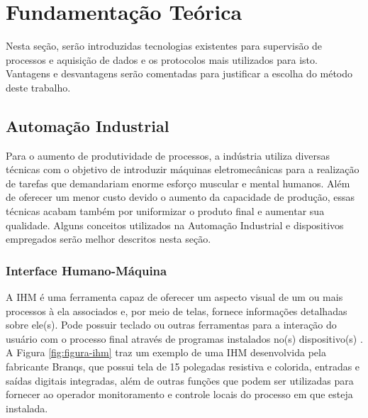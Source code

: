 \chapter{Fundamentação Teórica}
\label{cap:fundamentacao-teorica}

Nesta seção, serão introduzidas tecnologias existentes para supervisão de processos e aquisição de dados e os protocolos mais utilizados para isto. Vantagens e desvantagens serão comentadas para justificar a escolha do método deste trabalho.

    \section{Automação Industrial}        
    \label{sec:automacao-industrial}
    
    Para o aumento de produtividade de processos, a indústria utiliza diversas técnicas com o objetivo de introduzir máquinas eletromecânicas para a realização de tarefas que demandariam enorme esforço muscular e mental humanos. Além de oferecer um menor custo devido o aumento da capacidade de produção, essas técnicas acabam também por uniformizar o produto final e aumentar sua qualidade. Alguns conceitos utilizados na Automação Industrial e dispositivos empregados serão melhor descritos nesta seção.
    
    \subsection{Interface Humano-Máquina}
    \label{sec:ihm}

        A \gls{IHM} é uma ferramenta capaz de oferecer um aspecto visual de um ou mais processos à ela associados e, por meio de telas, fornece informações detalhadas sobre ele(s). Pode possuir teclado ou outras ferramentas para a interação do usuário com o processo final através de programas instalados no(s) dispositivo(s) \cite{mamede-instalacoes}. A Figura \ref{fig:figura-ihm} traz um exemplo de uma \gls{IHM} desenvolvida pela fabricante Branqs, que possui tela de 15 polegadas resistiva e colorida, entradas e saídas digitais integradas, além de outras funções que podem ser utilizadas para fornecer ao operador monitoramento e controle locais do processo em que esteja instalada.
        
